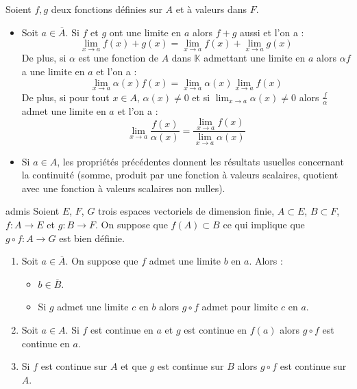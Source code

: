 \documentclass[french,11pt,twoside]{VcCours}
\begin{document}
\begin{Proposition}{} Soient $f,g$ deux fonctions définies sur $A$ et à valeurs dans $F$.

\begin{itemize}
\item Soit $a \in \overline{A}$. Si $f$ et $g$ ont une limite en $a$ alors $f+g$ aussi et l'on a :
$$ \lim_{x \rightarrow a} f(x)+g(x) = \lim_{x \rightarrow a} f(x) +  \lim_{x \rightarrow a} g(x)$$
De plus, si $\alpha$ est une fonction de $A$ dans $\mathbb{K}$ admettant une limite en $a$ alors $\alpha f$ a une limite en $a$ et l'on a :
$$  \lim_{x \rightarrow a} \alpha(x) f(x) =  \lim_{x \rightarrow a} \alpha(x)  \lim_{x \rightarrow a} f(x)$$
De plus, si pour tout $x \in A$, $\alpha(x) \neq 0$ et si $\lim_{x \rightarrow a} \alpha(x) \neq 0$ alors $\frac{f}{\alpha}$ admet une limite en $a$ et l'on a :
$$ \lim_{x \rightarrow a} \frac{f(x)}{\alpha(x)} = \frac{ \lim_{x \rightarrow a} f(x)}{ \lim_{x \rightarrow a} \alpha(x)}$$
\item Si $a \in A$, les propriétés précédentes donnent les résultats usuelles concernant la continuité (somme, produit par une fonction à valeurs scalaires, quotient avec une fonction à valeurs scalaires non nulles). 
\end{itemize}
\end{Proposition}

\begin{Proposition}{admis}
Soient $E$, $F$, $G$ trois espaces vectoriels de dimension finie, $A \subset E$, $B \subset F$, $f : A \rightarrow E$ et $g : B \rightarrow F$. On suppose que $f(A) \subset B$ ce qui implique que $g \circ f : A \rightarrow G$ est bien définie.

\begin{enumerate}
\item Soit $a \in \overline{A}$. On suppose que $f$ admet une limite $b$ en $a$. Alors :
\begin{itemize}
\item $b \in \overline{B}$.
\item Si $g$ admet une limite $c$ en $b$ alors $g \circ f$ admet pour limite $c$ en $a$.
\end{itemize}
\item Soit $a \in A$. Si $f$ est continue en $a$ et $g$ est continue en $f(a)$ alors $g \circ f$ est continue en $a$.
\item Si $f$ est continue sur $A$ et que $g$ est continue sur $B$ alors $g \circ f$ est continue sur $A$.
\end{enumerate}
\end{Proposition}
\end{document}
